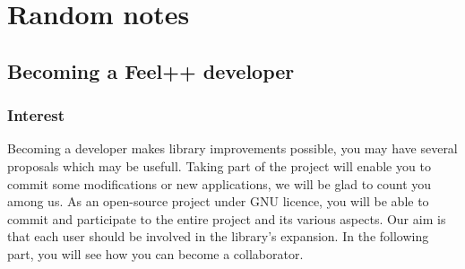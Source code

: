 \chapter{Random notes}
\label{cha:random-notes}

\section{Becoming a Feel++ developer}
\label{feeldevel}
\subsection{Interest}
Becoming a \feel developer makes library improvements possible, you may have several proposals which may be usefull. Taking part of the project will enable you to commit some modifications or new applications, we will be glad to count you among us. As an open-source project under GNU licence,  you will be able to commit and participate to the entire project and its various aspects. Our aim is that each user should be involved in the library's expansion. In the following part, you will see how you can become a \feel collaborator.

